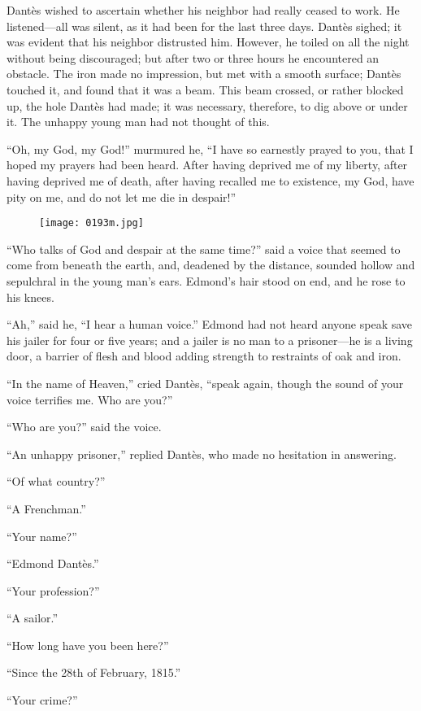 Dantès wished to ascertain whether his neighbor had really ceased to
work. He listened—all was silent, as it had been for the last three
days. Dantès sighed; it was evident that his neighbor distrusted him.
However, he toiled on all the night without being discouraged; but
after two or three hours he encountered an obstacle. The iron made no
impression, but met with a smooth surface; Dantès touched it, and found
that it was a beam. This beam crossed, or rather blocked up, the hole
Dantès had made; it was necessary, therefore, to dig above or under it.
The unhappy young man had not thought of this.

“Oh, my God, my God!” murmured he, “I have so earnestly prayed to you,
that I hoped my prayers had been heard. After having deprived me of my
liberty, after having deprived me of death, after having recalled me to
existence, my God, have pity on me, and do not let me die in despair!”

\begin{figure}[ht]
\texttt{[image: 0193m.jpg]}
\end{figure}

“Who talks of God and despair at the same time?” said a voice that
seemed to come from beneath the earth, and, deadened by the distance,
sounded hollow and sepulchral in the young man’s ears. Edmond’s hair
stood on end, and he rose to his knees.

“Ah,” said he, “I hear a human voice.” Edmond had not heard anyone
speak save his jailer for four or five years; and a jailer is no man to
a prisoner—he is a living door, a barrier of flesh and blood adding
strength to restraints of oak and iron.

“In the name of Heaven,” cried Dantès, “speak again, though the sound
of your voice terrifies me. Who are you?”

“Who are you?” said the voice.

“An unhappy prisoner,” replied Dantès, who made no hesitation in
answering.

“Of what country?”

“A Frenchman.”

“Your name?”

“Edmond Dantès.”

“Your profession?”

“A sailor.”

“How long have you been here?”

“Since the 28th of February, 1815.”

“Your crime?”

